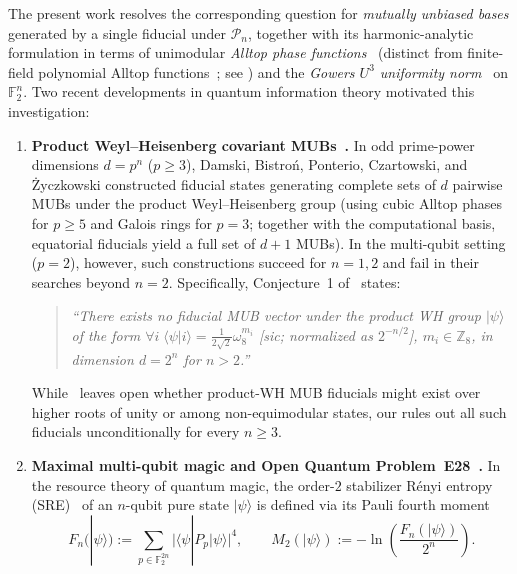 \documentclass[11pt,a4paper]{article}
\theoremstyle{plain}
\theoremstyle{definition}
\theoremstyle{remark}
\newcommand{\Z}{\mathbb{Z}}
\newcommand{\F}{\mathbb{F}}
\newcommand{\Pauli}{\mathcal{P}}
\newcommand{\ket}[1]{|#1\rangle}
\newcommand{\braket}[2]{\langle#1|#2\rangle}
\newcommand{\expval}[2]{\langle#1|#2|#1\rangle}
\newcommand{\abs}[1]{\lvert#1\rvert}
\numberwithin{equation}{section}
\begin{document}
The present work resolves the corresponding question for \emph{mutually unbiased bases} generated by a single fiducial under $\Pauli_n$, together with its harmonic-analytic formulation in terms of unimodular \emph{Alltop phase functions}~\cite{alltop1980complex,klappenecker2004constructions} (distinct from finite-field polynomial Alltop functions~\cite{hall2013family}; see ) and the \emph{Gowers $U^3$ uniformity norm}~\cite{gowers2001new} on $\F_2^n$. Two recent developments in quantum information theory motivated this investigation:
\begin{enumerate}[leftmargin=1.8em]
  \item \textbf{Product Weyl--Heisenberg covariant MUBs~\cite{damski2026product}.} In odd prime-power dimensions $d = p^n$ ($p \ge 3$), Damski, Bistro\'n, Ponterio, Czartowski, and \.Zyczkowski constructed fiducial states generating complete sets of $d$ pairwise MUBs under the product Weyl--Heisenberg group (using cubic Alltop phases for $p \ge 5$ and Galois rings for $p = 3$; together with the computational basis, equatorial fiducials yield a full set of $d+1$ MUBs). In the multi-qubit setting ($p = 2$), however, such constructions succeed for $n = 1, 2$ and fail in their searches beyond $n = 2$. Specifically, Conjecture~1 of~\cite{damski2026product} states:
  \begin{quote}\small\itshape
    ``There exists no fiducial MUB vector under the product WH group $\ket{\psi}$ of the form $\forall i\;\braket{\psi}{i} = \frac{1}{2\sqrt{2}}\omega_8^{m_i}$ \textnormal{[sic; normalized as $2^{-n/2}$]}, $m_i \in \Z_8$, in dimension $d = 2^n$ for $n > 2$.''
  \end{quote}
  While~\cite{damski2026product} leaves open whether product-WH MUB fiducials might exist over higher roots of unity or among non-equimodular states, our  rules out all such fiducials unconditionally for every $n \ge 3$.
  \item \textbf{Maximal multi-qubit magic and Open Quantum Problem~E28~\cite{leone2022stabilizer,cuffaro2024quantum,liu2026maximal,oqpE28}.} In the resource theory of quantum magic, the order-$2$ stabilizer R\'enyi entropy (SRE)~\cite{leone2022stabilizer} of an $n$-qubit pure state $\ket{\psi}$ is defined via its Pauli fourth moment
  \begin{equation}\label{eq:Fn-M2-def}
    F_n(\ket{\psi}) := \sum_{p \in \F_2^{2n}} \abs{\expval{\psi}{P_p}}^4,
    \qquad
    M_2(\ket{\psi}) := -\ln\!\left(\frac{F_n(\ket{\psi})}{2^n}\right).
  \end{equation}

\end{enumerate}
\end{document}
